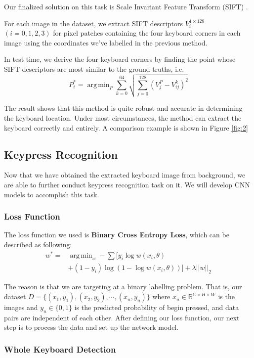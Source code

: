 \documentclass[10pt,twocolumn,letterpaper]{article}
\DeclareMathOperator*{\argmin}{arg\,min}
\begin{document}
Our finalized solution on this task is Scale Invariant Feature Transform (SIFT) \cite{SIFT}.

For each image in the dataset, we extract SIFT descriptors \(V_i^{1\times128}\) \((i=0,1,2,3)\) for pixel patches containing the four keyboard corners in each image using the coordinates we've labelled in the previous method.

In test time, we derive the four keyboard corners by finding the point whose SIFT descriptors are most similar to the ground truths, i.e.
$$P_i^* =\argmin_P\sum_{k=0}^{64}{\sqrt{\sum_{j=0}^{128}(V_j^P-V_{ij}^k)^2}}$$

The result shows that this method is quite robust and accurate in determining the keyboard location.
Under most circumstances, the method can extract the keyboard correctly and entirely.
A comparison example is shown in Figure \ref{fig:2}

\subsection{Keypress Recognition} \label{keypressdetection}

Now that we have obtained the extracted keyboard image from background, we are able to further conduct keypress recognition task on it. We will develop CNN models to accomplish this task.

\subsubsection{Loss Function}
The loss function we used is \textbf{Binary Cross Entropy Loss}, which can be described as following:
\begin{align*}
   w^*=&\argmin_w-\sum[y_i\log{w(x_i,\theta)} \\
      &+(1-y_i)\log(1-\log{w(x_i,\theta)})]+\lambda||w||_2
\end{align*}

The reason is that we are targeting at a binary labelling problem.
That is, our dataset $D = \{(x_1, y_1), (x_2, y_2), \cdots, (x_n, y_n)\}$ where $x_n\in\mathbb{R}^{C\times H\times W}$ is the images and $y_n\in\{0,1\}$ is the predicted probability of begin pressed, and data pairs are independent of each other.
After defining our loss function, our next step is to process the data and set up the network model.

\subsubsection{Whole Keyboard Detection}
\label{Keypress-keyboard}
\end{document}
